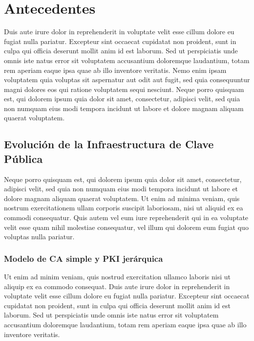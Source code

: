 \chapter{Antecedentes} \label{cap:antecedentes}

Duis aute irure dolor in reprehenderit in voluptate velit esse cillum dolore eu fugiat nulla pariatur. Excepteur sint occaecat cupidatat non proident, sunt in culpa qui officia deserunt mollit anim id est laborum. Sed ut perspiciatis unde omnis iste natus error sit voluptatem accusantium doloremque laudantium, totam rem aperiam eaque ipsa quae ab illo inventore veritatis. Nemo enim ipsam voluptatem quia voluptas sit aspernatur aut odit aut fugit, sed quia consequuntur magni dolores eos qui ratione voluptatem sequi nesciunt. Neque porro quisquam est, qui dolorem ipsum quia dolor sit amet, consectetur, adipisci velit, sed quia non numquam eius modi tempora incidunt ut labore et dolore magnam aliquam quaerat voluptatem.


\section{Evolución de la Infraestructura de Clave Pública}

Neque porro quisquam est, qui dolorem ipsum quia dolor sit amet, consectetur, adipisci velit, sed quia non numquam eius modi tempora incidunt ut labore et dolore magnam aliquam quaerat voluptatem. Ut enim ad minima veniam, quis nostrum exercitationem ullam corporis suscipit laboriosam, nisi ut aliquid ex ea commodi consequatur. Quis autem vel eum iure reprehenderit qui in ea voluptate velit esse quam nihil molestiae consequatur, vel illum qui dolorem eum fugiat quo voluptas nulla pariatur.

\subsection{Modelo de CA simple y PKI jerárquica}

Ut enim ad minim veniam, quis nostrud exercitation ullamco laboris nisi ut aliquip ex ea commodo consequat. Duis aute irure dolor in reprehenderit in voluptate velit esse cillum dolore eu fugiat nulla pariatur. Excepteur sint occaecat cupidatat non proident, sunt in culpa qui officia deserunt mollit anim id est laborum. Sed ut perspiciatis unde omnis iste natus error sit voluptatem accusantium doloremque laudantium, totam rem aperiam eaque ipsa quae ab illo inventore veritatis.

